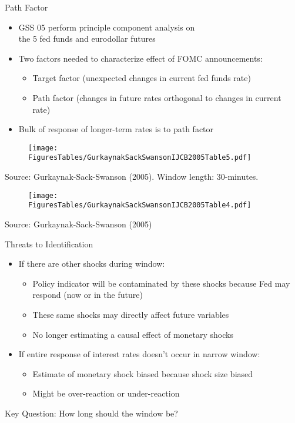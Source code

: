 \documentclass[11pt,aspectratio=169,xcolor={dvipsnames},hyperref={pdftex,pdfpagemode=UseNone,hidelinks,pdfdisplaydoctitle=true},usepdftitle=false]{beamer}
\begin{document}
\begin{frame}{Path Factor}
\begin{itemize}
\itemsep1em 
\item GSS 05 perform principle component analysis on \\ the 5 fed funds and eurodollar futures
\item Two factors needed to characterize effect of FOMC announcements:
\begin{itemize}
\item Target factor (unexpected changes in current fed funds rate)
\item Path factor (changes in future rates orthogonal to changes in current rate) \pause
\end{itemize}
\item Bulk of response of longer-term rates is to path factor
\end{itemize}
\end{frame}

\begin{frame}
\begin{figure}
\centering
\texttt{[image: FiguresTables/GurkaynakSackSwansonIJCB2005Table5.pdf]}
\end{figure}
\vspace{-6mm}
{\scriptsize Source: Gurkaynak-Sack-Swanson (2005). Window length: 30-minutes.}
\end{frame}

\begin{frame}
\begin{figure}
\centering
\texttt{[image: FiguresTables/GurkaynakSackSwansonIJCB2005Table4.pdf]}
\end{figure}
\vspace{-6mm}
{\scriptsize Source: Gurkaynak-Sack-Swanson (2005)}
\end{frame}


\begin{frame}{Threats to Identification}
\begin{itemize}
\item If there are other shocks during window: 
\begin{itemize}
\item Policy indicator will be contaminated by these shocks because Fed may respond (now or in the future)
\item These same shocks may directly affect future variables		
\item No longer estimating a causal effect of monetary shocks
\end{itemize}
\item If entire response of interest rates doesn't occur in narrow window: 
\begin{itemize}
\item Estimate of monetary shock biased because shock size biased
\item Might be over-reaction or under-reaction
\end{itemize}
\end{itemize}
\medskip
Key Question: How long should the window be?
\end{frame}
\end{document}
